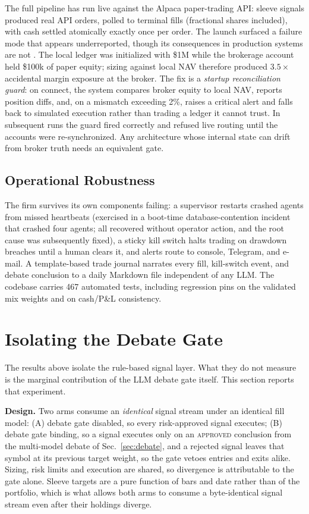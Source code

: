 \documentclass[10pt,twocolumn]{IEEEtran}
\begin{document}
The full pipeline has run live against the Alpaca paper-trading API:
sleeve signals produced real API orders, polled to terminal fills
(fractional shares included), with cash settled atomically exactly once per
order. The launch surfaced a failure mode that appears underreported, though
its consequences in production systems are not \cite{sec2013knight,
kirilenko2017flash}. The
local ledger was initialized with \$1M while the brokerage account held
\$100k of paper equity; sizing against local NAV therefore produced
$3.5\times$ accidental margin exposure at the broker. The fix is a
\emph{startup reconciliation guard}: on connect, the system compares
broker equity to local NAV, reports position diffs, and, on a mismatch
exceeding 2\%, raises a critical alert and falls back to simulated
execution rather than trading a ledger it cannot trust. In subsequent runs
the guard fired correctly and refused live routing until the accounts were
re-synchronized. Any architecture whose internal state can drift from
broker truth needs an equivalent gate.

\subsection{Operational Robustness}

The firm survives its own components failing: a supervisor restarts crashed
agents from missed heartbeats (exercised in a boot-time database-contention
incident that crashed four agents; all recovered without operator action,
and the root cause was subsequently fixed), a sticky kill switch halts
trading on drawdown breaches until a human clears it, and alerts route to
console, Telegram, and e-mail. A template-based trade journal narrates every
fill, kill-switch event, and debate conclusion to a daily Markdown file
independent of any LLM. The codebase carries 467 automated tests, including
regression pins on the validated mix weights and on cash/P\&L consistency.

\section{Isolating the Debate Gate}
\label{sec:aitest}

The results above isolate the rule-based signal layer. What they do not
measure is the marginal contribution of the LLM debate gate itself. This
section reports that experiment.

\textbf{Design.} Two arms consume an \emph{identical} signal stream under an
identical fill model: (A) debate gate disabled, so every risk-approved signal
executes; (B) debate gate binding, so a signal executes only on an
\textsc{approved} conclusion from the multi-model debate of
Sec.~\ref{sec:debate}, and a rejected signal leaves that symbol at its
previous target weight, so the gate vetoes entries and exits alike. Sizing,
risk limits and execution are shared, so divergence is attributable to the
gate alone. Sleeve targets are a pure function of bars and date rather than of
the portfolio, which is what allows both arms to consume a byte-identical
signal stream even after their holdings diverge.
\end{document}
